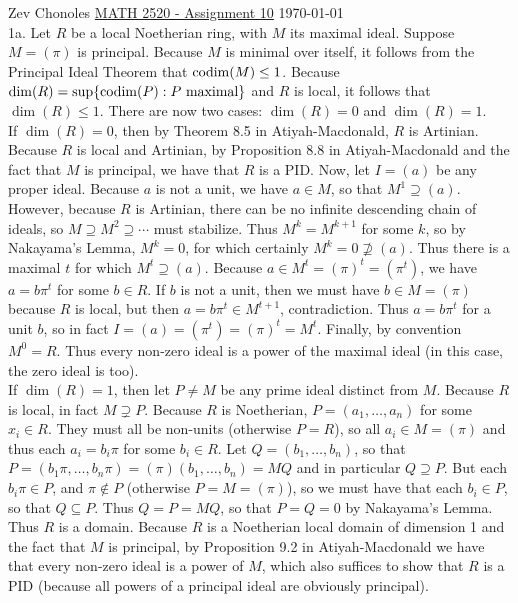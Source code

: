 \documentclass[11pt]{article}
\begin{document}
Zev Chonoles \hfill 
\underline{MATH 2520 - Assignment 10} \hfill \today\\

\num{1a.} Let $R$ be a local Noetherian ring, with $M$ its maximal
ideal. Suppose $M=(\pi)$ is principal. Because $M$ is minimal over itself,
it follows from the Principal Ideal Theorem that $\operatorname{codim}(M)\leq1$. Because
$\operatorname{dim}(R)=\sup\{\operatorname{codim}(P):P\text{ maximal}\}$ and $R$ is local, it follows
that $\dim(R)\leq1$. There are now two cases: $\dim(R)=0$ and $\dim(R)=1$.\\

If $\dim(R)=0$, then by Theorem 8.5 in Atiyah-Macdonald, $R$ is
Artinian. Because $R$ is local and Artinian, by Proposition 8.8 in
Atiyah-Macdonald and the fact that $M$ is principal, we have that $R$ is
a PID. Now, let $I=(a)$ be any proper ideal. Because $a$ is not a unit,
we have $a\in M$, so that $M^1\supseteq (a)$. However, because $R$ is
Artinian, there can be no infinite descending chain of ideals, so $M\supseteq
M^2\supseteq\cdots$ must stabilize. Thus $M^k=M^{k+1}$ for some $k$, so by
Nakayama's Lemma, $M^k=0$, for which certainly $M^k=0\not\supseteq(a)$. Thus
there is a maximal $t$ for which $M^t\supseteq(a)$. Because $a\in
M^t=(\pi)^t=(\pi^t)$, we have $a=b\pi^t$ for some $b\in R$. If $b$ is not
a unit, then we must have $b\in M=(\pi)$ because $R$ is local, but then
$a=b\pi^t\in M^{t+1}$, contradiction. Thus $a=b\pi^t$ for a unit $b$, so in
fact $I=(a)=(\pi^t)=(\pi)^t=M^t$. Finally, by convention $M^0=R$. Thus every
non-zero ideal is a power of the maximal ideal (in this case, the zero ideal
is too).\\

If $\dim(R)=1$, then let $P\neq M$ be any prime ideal distinct from
$M$. Because $R$ is local, in fact $M\supsetneq P$. Because $R$ is
Noetherian, $P=(a_1,\ldots,a_n)$ for some $x_i\in R$. They must all
be non-units (otherwise $P=R$), so all $a_i\in M=(\pi)$ and thus each
$a_i=b_i\pi$ for some $b_i\in R$. Let $Q=(b_1,\ldots,b_n)$, so that
$P=(b_1\pi,\ldots,b_n\pi)=(\pi)(b_1,\ldots,b_n)=MQ$ and in particular
$Q\supseteq P$. But each $b_i\pi\in P$, and $\pi\notin P$ (otherwise
$P=M=(\pi)$), so we must have that each $b_i\in P$, so that $Q\subseteq
P$. Thus $Q=P=MQ$, so that $P=Q=0$ by Nakayama's Lemma. Thus $R$ is a
domain. Because $R$ is a Noetherian local domain of dimension 1 and the fact
that $M$ is principal, by Proposition 9.2 in Atiyah-Macdonald we have that
every non-zero ideal is a power of $M$, which also suffices to show that $R$
is a PID (because all powers of a principal ideal are obviously principal).
\\
\end{document}
